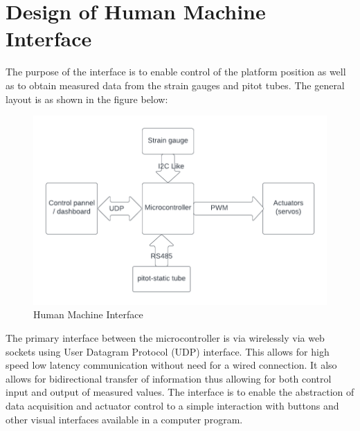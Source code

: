 \section{Design of Human Machine Interface}
The purpose of the interface is to enable control of the platform position as well as to obtain measured data from the strain gauges and pitot tubes. 
The general layout is as shown in the figure below:
\begin{center}
\begin{figure}
\centering
\includegraphics{Figures/Interface}
\caption[Human Machine Interface]{Human Machine Interface}
\end{figure}
\end{center}

The primary interface between the microcontroller is via wirelessly via web sockets using User Datagram Protocol (UDP) interface. This allows for high speed low latency communication without need for a wired connection. It also allows for bidirectional transfer of information thus allowing for both control input and output of measured values. The interface is to enable the abstraction of data acquisition and actuator control to a simple interaction with buttons and other visual interfaces available in a computer program.

